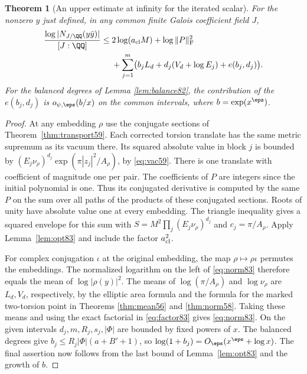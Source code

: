 \documentclass[a4paper,11pt]{article}
\newtheorem{theorem}[proposition]{Theorem}
\theoremstyle{definition}
\theoremstyle{remark}
\numberwithin{equation}{section}
\begin{document}
\begin{theorem}[An upper estimate at infinity for the iterated scalar]
\label{thm:norm83}
For the nonzero \(y\) just defined, in any common finite Galois
coefficient field \(J\),
\begin{align}
 \frac{\log|N_{J/\QQ}(y\bar y)|}{[J:\QQ]}
 \le{}&2\log(a_{\rm cl}M)+\log\|P\|_{\rm F}^2 \notag\\
 &+\sum_{j=1}^m
      \bigl(b_j L_d+d_j(V_d+\log E_j)+e(b_j,d_j)\bigr).
                                                        \label{eq:norm83}
\end{align}
For the balanced degrees of
Lemma \ref{lem:balance82},
the contribution of the \(e(b_j,d_j)\) is \(o_{\psi,\eps}(b/x)\)
on the common intervals, where \(b=\exp(x^\eps)\).
\end{theorem}
\begin{proof}
At any embedding \(\rho\) use the conjugate sections of
Theorem~\ref{thm:transport59}. Each corrected torsion translate
has the same metric supremum as its vacuum there. Its squared
absolute value in block \(j\) is bounded by
\((E_j\nu_\rho)^{d_j}\exp(\pi |z_j|^2/A_\rho)\), by
\eqref{eq:vac59}. There is one translate with coefficient of
magnitude one per pair. The coefficients of \(P\) are integers
since the initial polynomial is one. Thus its conjugated
derivative is computed by the same \(P\) on the sum over all
paths of the products of these conjugated sections. Roots of
unity have absolute value one at every embedding. The triangle
inequality gives a squared envelope for this sum with
\(S=M^2\prod_j(E_j\nu_\rho)^{d_j}\) and \(c_j=\pi/A_\rho\).
Apply Lemma~\ref{lem:opt83} and include the factor \(a_{\rm cl}^2\).

For complex conjugation \(\iota\) at the original embedding,
the map \(\rho\mapsto\rho\iota\) permutes the embeddings. The
normalized logarithm on the left of \eqref{eq:norm83} therefore
equals the mean of \(\log|\rho(y)|^2\). The means of
\(\log(\pi/A_\rho)\) and \(\log\nu_\rho\) are \(L_d,V_d\),
respectively, by the elliptic area formula and the formula for
the marked two-torsion point in
Theorems \ref{thm:mean56} and \ref{thm:norm58}.
Taking these means and using the exact factorial in \eqref{eq:factor83}
gives \eqref{eq:norm83}. On the given intervals \(d_j,m,R_j,s_j,|\Phi|\)
are bounded by fixed powers of \(x\). The balanced degrees give
\(b_j\le R_j|\Phi|(a+B'+1)\), so \(\log(1+b_j)=O_\eps(x^\eps+\log x)\).
The final assertion now follows from the last bound of
Lemma~\ref{lem:opt83} and the growth of \(b\).
\end{proof}
\end{document}
